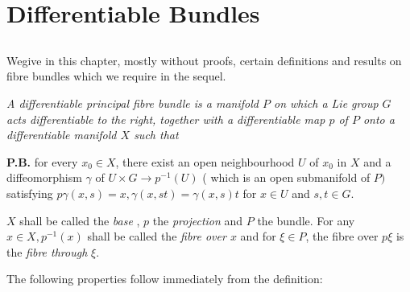 
\chapter{Differentiable Bundles}\label{chap2} %

\section{}\label{chap2:sec1} %

We\pageoriginale give in this chapter, mostly without proofs, certain
definitions and results on fibre bundles which we require in the sequel. 
 
\setcounter{defn}{0}
\begin{defn}\label{chap2:sec1:def1} %
  \em{ A differentiable principal fibre bundle } is a manifold $P$ on
  which a Lie group $G$ acts differentiable to the right, together
  with a differentiable map $p$ of $P$ onto a differentiable manifold
  $X$ such that  

  \textbf{P.B.} for every $ x_0 \in X $, there exist an open
  neighbourhood $U$ of $x_0$ in  $X$ and a diffeomorphism $\gamma$ of $
  U \times G \to p^{-1} (U) $ ( which is an open submanifold of $P)$
  satisfying $ p \gamma ( x,s ) = x , \gamma ( x, st ) = \gamma (x,s)
  t $ for $ x \in U $ and  $ s, t \in G $. 
\end{defn} 
 
 $X$ shall be called the \textit{ base }, $p$ the \textit{projection}
and $P$ the bundle. For any $ x \in X , p^{-1}(x) $ shall be called
the  \textit{fibre over $x$ } and for $ \xi \in P $, the fibre over $
p \xi $ is the \textit{fibre through} $\xi$.  
 
The following properties follow immediately from the definition:
 
